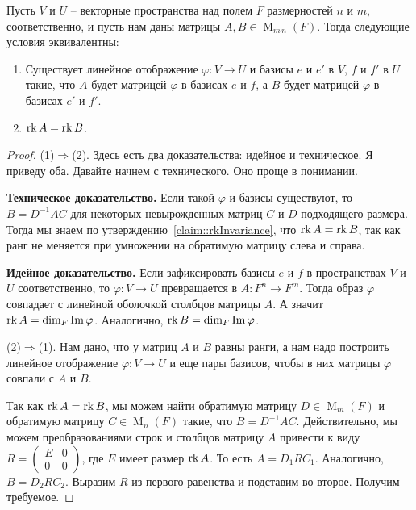 \begin{claim}
\label{claim::HomClassification}
Пусть $V$ и $U$ -- векторные пространства над полем $F$ размерностей $n$ и $m$, соответственно, и пусть нам даны матрицы $A, B\in \operatorname{M}_{m\,n}(F)$.
Тогда следующие условия эквивалентны:
\begin{enumerate}
\item Существует линейное отображение $\varphi\colon V\to U$ и базисы $e$ и $e'$ в $V$, $f$ и $f'$ в $U$ такие, что $A$ будет матрицей $\varphi$ в базисах $e$ и $f$, а $B$ будет матрицей $\varphi$ в базисах $e'$ и $f'$.

\item $\operatorname{rk} A = \operatorname{rk} B$.
\end{enumerate}
\end{claim}
\begin{proof}
(1)$\Rightarrow$(2).
Здесь есть два доказательства: идейное и техническое.
Я приведу оба.
Давайте начнем с технического.
Оно проще в понимании.

\textbf{Техническое доказательство.} Если такой $\varphi$ и базисы существуют, то $B = D^{-1}AC$ для некоторых невырожденных матриц $C$ и $D$ подходящего размера.
Тогда мы знаем по утверждению~\ref{claim::rkInvariance}, что $\operatorname{rk} A = \operatorname{rk} B$, так как ранг не меняется при умножении на обратимую матрицу слева и справа.

\textbf{Идейное доказательство.} Если зафиксировать базисы $e$ и $f$ в пространствах $V$ и $U$ соответственно, то $\varphi \colon V\to U$ превращается в $A\colon F^n \to F^m$.
Тогда образ $\varphi$ совпадает с линейной оболочкой столбцов матрицы $A$.
А значит $\operatorname{rk} A = \dim_F \operatorname{Im} \varphi$.
Аналогично, $\operatorname{rk} B = \dim_F \operatorname{Im} \varphi$.

(2)$\Rightarrow$(1).
Нам дано, что у матриц $A$ и $B$ равны ранги, а нам надо построить линейное отображение $\varphi\colon V\to U$ и еще пары базисов, чтобы в них матрицы $\varphi$ совпали с $A$ и $B$.

Так как $\operatorname{rk} A = \operatorname{rk} B$, мы можем найти обратимую матрицу $D\in \operatorname{M}_m(F)$ и обратимую матрицу $C\in \operatorname{M}_n(F)$ такие, что $B = D^{-1}AC$.
 Действительно, мы можем преобразованиями строк и столбцов матрицу $A$ привести к виду $R = \left(\begin{smallmatrix}{E}&{0}\\{0}&{0}\end{smallmatrix}\right)$, где $E$ имеет размер $\operatorname{rk} A$.
 То есть $A = D_1 R C_1$.
 Аналогично, $B = D_2 R C_2$.
 Выразим $R$ из первого равенства и подставим во второе.
Получим требуемое.


\end{proof}
